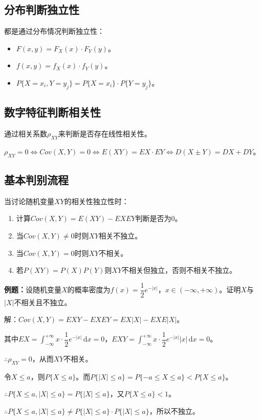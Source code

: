 \documentclass[UTF8, 12pt]{ctexart}
\begin{document}
\subsection{分布判断独立性}

都是通过分布情况判断独立性：

\begin{itemize}
    \item $F(x,y)=F_X(x)\cdot F_Y(y)$。
    \item $f(x,y)=f_X(x)\cdot f_Y(y)$。
    \item $P\{X=x_i,Y=y_j\}=P\{X=x_i\}\cdot P\{Y=y_j\}$。
\end{itemize}

\subsection{数字特征判断相关性}

通过相关系数$\rho_{XY}$来判断是否存在线性相关性。

$\rho_{XY}=0\Leftrightarrow Cov(X,Y)=0\Leftrightarrow E(XY)=EX\cdot EY\Leftrightarrow D(X\pm Y)=DX+DY$。

\subsection{基本判别流程}

当讨论随机变量$XY$的相关性独立性时：

\begin{enumerate}
    \item 计算$Cov(X,Y)=E(XY)-EXEY$判断是否为0。
    \item 当$Cov(X,Y)\neq0$时则$XY$相关不独立。
    \item 当$Cov(X,Y)=0$时则$XY$不相关。
    \item 若$P(XY)=P(X)P(Y)$则$XY$不相关但独立，否则不相关不独立。
\end{enumerate}

\textbf{例题：}设随机变量$X$的概率密度为$f(x)=\dfrac{1}{2}e^{-\vert x\vert}$，$x\in(-\infty,+\infty)$。证明$X$与$\vert X\vert$不相关且不独立。

解：$Cov(X,Y)=EXY-EXEY=EX\vert X\vert-EXE\vert X\vert$。

其中$EX=\displaystyle{\int_{-\infty}^{+\infty}}x\cdot\dfrac{1}{2}e^{-\vert x\vert}\,\textrm{d}x=0$，$EXY=\displaystyle{\int_{-\infty}^{+\infty}}x\cdot\dfrac{1}{2}e^{-\vert x\vert}\vert x\vert\,\textrm{d}x=0$。

$\therefore\rho_{XY}=0$，从而$XY$不相关。

令$X\leqslant a$，则$P\{X\leqslant a\}$。而$P\{\vert X\vert\leqslant a\}=P\{-a\leqslant X\leqslant a\}<P\{X\leqslant a\}$。

$\therefore P\{X\leqslant a,\vert X\vert\leqslant a\}=P\{\vert X\vert\leqslant a\}$，又$P\{X\leqslant a\}<1$。

$\therefore P\{X\leqslant a,\vert X\vert\leqslant a\}\neq P\{\vert X\vert\leqslant a\}\cdot P\{\vert X\vert\leqslant a\}$，所以不独立。
\end{document}

